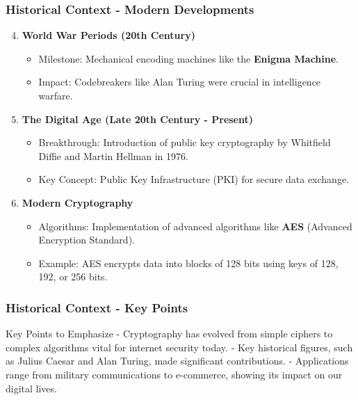 \documentclass{beamer}
\begin{document}
\begin{frame}[fragile]
    \frametitle{Historical Context - Modern Developments}
    \begin{enumerate}
        \setcounter{enumi}{3}
        \item \textbf{World War Periods (20th Century)}
            \begin{itemize}
                \item Milestone: Mechanical encoding machines like the \textbf{Enigma Machine}.
                \item Impact: Codebreakers like Alan Turing were crucial in intelligence warfare.
            \end{itemize}

        \item \textbf{The Digital Age (Late 20th Century - Present)}
            \begin{itemize}
                \item Breakthrough: Introduction of public key cryptography by Whitfield Diffie and Martin Hellman in 1976.
                \item Key Concept: Public Key Infrastructure (PKI) for secure data exchange.
            \end{itemize}

        \item \textbf{Modern Cryptography}
            \begin{itemize}
                \item Algorithms: Implementation of advanced algorithms like \textbf{AES} (Advanced Encryption Standard).
                \item Example: AES encrypts data into blocks of 128 bits using keys of 128, 192, or 256 bits.
            \end{itemize}
    \end{enumerate}
\end{frame}

\begin{frame}[fragile]
    \frametitle{Historical Context - Key Points}
    \begin{block}{Key Points to Emphasize}
        - Cryptography has evolved from simple ciphers to complex algorithms vital for internet security today.
        - Key historical figures, such as Julius Caesar and Alan Turing, made significant contributions.
        - Applications range from military communications to e-commerce, showing its impact on our digital lives.
    \end{block}
\end{frame}
\end{document}
